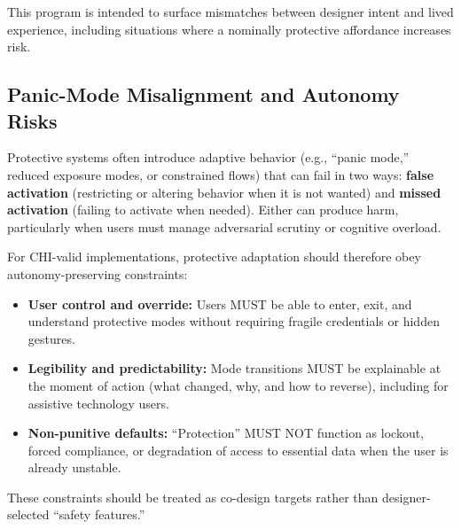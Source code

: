 \documentclass[12pt]{article}
\begin{document}
This program is intended to surface mismatches between designer intent and lived experience, including situations where a nominally protective affordance increases risk.

\subsection{Panic-Mode Misalignment and Autonomy Risks}
Protective systems often introduce adaptive behavior (e.g., ``panic mode,'' reduced exposure modes, or constrained flows) that can fail in two ways: \textbf{false activation} (restricting or altering behavior when it is not wanted) and \textbf{missed activation} (failing to activate when needed). Either can produce harm, particularly when users must manage adversarial scrutiny or cognitive overload.

For CHI-valid implementations, protective adaptation should therefore obey autonomy-preserving constraints:
\begin{itemize}
\item \textbf{User control and override:} Users MUST be able to enter, exit, and understand protective modes without requiring fragile credentials or hidden gestures.
\item \textbf{Legibility and predictability:} Mode transitions MUST be explainable at the moment of action (what changed, why, and how to reverse), including for assistive technology users.
\item \textbf{Non-punitive defaults:} ``Protection'' MUST NOT function as lockout, forced compliance, or degradation of access to essential data when the user is already unstable.
\end{itemize}

These constraints should be treated as co-design targets rather than designer-selected ``safety features.''
\end{document}
